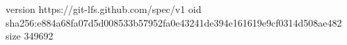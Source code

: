 version https://git-lfs.github.com/spec/v1
oid sha256:e884a68fa07d5d008533b57952fa0e43241de394e161619e9cf0314d508ae482
size 349692
